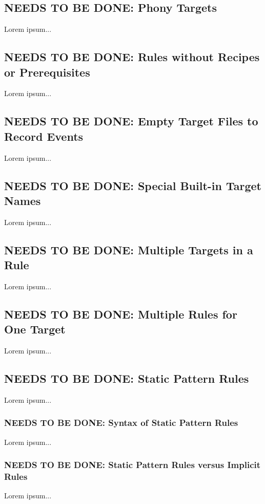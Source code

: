\documentclass{charun}
\begin{document}
\begin{multicols*}{2}
\color{gray}
\subsection{NEEDS TO BE DONE: Phony Targets}
Lorem ipsum...
\color{black}

\color{gray}
\subsection{NEEDS TO BE DONE: Rules without Recipes or Prerequisites}
Lorem ipsum...
\color{black}

\color{gray}
\subsection{NEEDS TO BE DONE: Empty Target Files to Record Events}
Lorem ipsum...
\color{black}

\color{gray}
\subsection{NEEDS TO BE DONE: Special Built-in Target Names}
Lorem ipsum...
\color{black}

\color{gray}
\subsection{NEEDS TO BE DONE: Multiple Targets in a Rule}
Lorem ipsum...
\color{black}

\color{gray}
\subsection{NEEDS TO BE DONE: Multiple Rules for One Target}
Lorem ipsum...
\color{black}

\color{gray}
\subsection{NEEDS TO BE DONE: Static Pattern Rules}
Lorem ipsum...
\color{black}

\color{gray}
\subsubsection{NEEDS TO BE DONE: Syntax of Static Pattern Rules}
Lorem ipsum...
\color{black}

\color{gray}
\subsubsection{NEEDS TO BE DONE: Static Pattern Rules versus Implicit Rules}
Lorem ipsum...
\color{black}


\end{multicols*}
\end{document}
